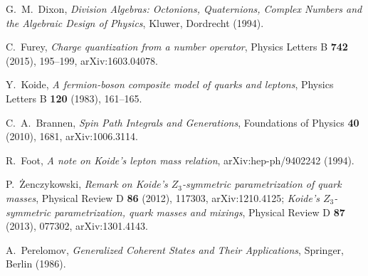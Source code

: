 G.~M.~Dixon, \emph{Division Algebras: Octonions, Quaternions, Complex Numbers and the Algebraic Design of Physics},
Kluwer, Dordrecht (1994).

C.~Furey, \emph{Charge quantization from a number operator}, Physics Letters B \textbf{742} (2015), 195--199, arXiv:1603.04078.

Y.~Koide, \emph{A fermion-boson composite model of quarks and leptons}, Physics Letters B \textbf{120} (1983), 161--165.

C.~A.~Brannen, \emph{Spin Path Integrals and Generations}, Foundations of Physics \textbf{40} (2010), 1681, arXiv:1006.3114.

R.~Foot, \emph{A note on Koide's lepton mass relation}, arXiv:hep-ph/9402242 (1994).

P.~\.Zenczykowski, \emph{Remark on Koide's $Z_3$-symmetric parametrization of quark masses}, Physical Review D \textbf{86}
(2012), 117303, arXiv:1210.4125; \emph{Koide's $Z_3$-symmetric parametrization, quark masses and mixings}, Physical Review D
\textbf{87} (2013), 077302, arXiv:1301.4143.

A.~Perelomov, \emph{Generalized Coherent States and Their Applications}, Springer, Berlin (1986).

